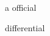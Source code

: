\documentclass{article}
\renewcommand\rmdefault{BaskervilleF-TOsF}
\begin{document}
a official

\renewcommand\rmdefault{BaskervilleF-TLF}
\rmfamily
differential
\end{document}
